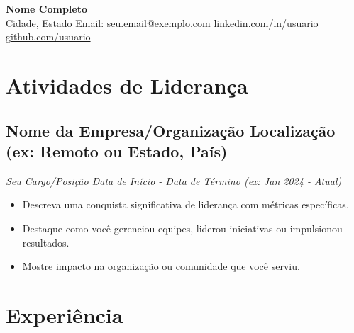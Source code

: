 \documentclass[a4paper,10pt]{article}
\begin{document}
\begin{center}
    {\LARGE \textbf{Nome Completo}} 
    \\ [0.1cm]
    Cidade, Estado
    {\textbullet}
    Email: \href{mailto:seu.email@exemplo.com}{seu.email@exemplo.com} 
    {\textbullet}
    \href{https://www.linkedin.com/in/usuario}{linkedin.com/in/usuario} 
    {\textbullet}
    \href{https://github.com/usuario}{github.com/usuario}
\end{center}


\section{Atividades de Liderança} 
    \subsection*{\texorpdfstring{
            \textbf{Nome da Empresa/Organização} \hfill Localização (ex: Remoto ou Estado, País)
        }{
            Nome da Empresa (Liderança) -- Localização
        }}
    \textit{Seu Cargo/Posição \hfill Data de Início - Data de Término (ex: Jan 2024 - Atual)}
        \begin{itemize}
            \item Descreva uma conquista significativa de liderança com métricas específicas.
            \item Destaque como você gerenciou equipes, liderou iniciativas ou impulsionou resultados.
            \item Mostre impacto na organização ou comunidade que você serviu.
        \end{itemize}


\section{Experiência}
\end{document}
